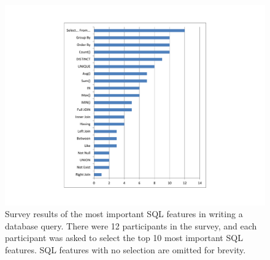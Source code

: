 
\begin{figure}[t]
  \centering
  \includegraphics[scale=0.50]{survey}
  \vspace*{-1.0ex}\caption {{\label{fig:survey}
  Survey results of the most important SQL features
  in writing a database query. There were 12 participants
  in the survey, and each participant was asked to
  select the top 10 most important SQL features.
  SQL features with no selection  are omitted for brevity.
}}

\end{figure}

\newcommand{\q}{\langle query\rangle}
\newcommand{\db}{\langle db\rangle}
\newcommand{\pat}{\langle pat\rangle}
\newcommand{\bug}{\langle bug\rangle}
\newcommand{\dist}{\langle distance\rangle}
\newcommand{\sem}[1]{\llbracket #1\rrbracket}
\newcommand{\lit}[1]{\texttt{#1}}

\newcommand{\column}{\langle column\rangle}
\newcommand{\dbtable}{\langle table\rangle}
\newcommand{\cond}{\langle cond\rangle}
\newcommand{\op}{\langle op\rangle}
\newcommand{\e}{\langle expr\rangle}
\newcommand{\ce}{\langle cexpr\rangle}

